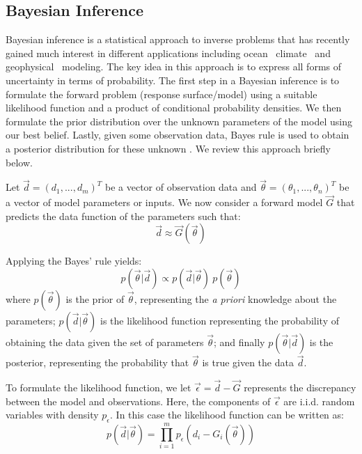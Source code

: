 \subsection{Bayesian Inference}
 \label{sec:inference}
 
Bayesian inference is a statistical approach to inverse problems
that has recently gained much interest in different applications including
ocean~\citep{Alexanderian2011a,Zedler2012,sraj:2013a}
climate~\citep{OlsonEtAl2012} and geophysical~\citep{Malinverno2002} modeling.
The key idea in this approach is to express all forms of uncertainty
in terms of probability. The first step in a Bayesian inference 
is to formulate the forward problem (response surface/model) using 
a suitable likelihood function and a product of conditional probability densities. 
We then formulate the prior distribution over the unknown parameters of the model
using our best belief. Lastly, given some observation data, Bayes rule 
is used to obtain a posterior distribution for these unknown
\citep{sivia}. We review this approach briefly below.

Let $\vec{d}=(d_1,...,d_m)^T$ be a vector of observation data and $\vec{\theta}=(\theta_1,...,\theta_n)^T$ be a vector of model parameters or inputs. We now consider a forward model $\vec G$ that predicts the data function of 
the parameters such that:
\begin{equation}
\vec d \approx \vec{G}( \vec \theta)
\end{equation}


Applying the Bayes' rule yields:
\begin{equation}
 p(\vec{\theta}| \vec d) \propto 
 p(\vec d | \vec{\theta}) \ p(\vec{\theta})  
\label{eq:bayes}
\end{equation}
where $p(\vec{\theta})$ is the prior of $\vec{\theta}$, representing the \emph{a priori} knowledge
about the parameters; 
$p(\vec d| \vec{\theta})$ is the likelihood function representing
the probability of obtaining the data given the set of parameters $\vec{\theta}$;
and finally $p(\vec{\theta}| \vec d)$ is the posterior,
representing the probability that $\vec{\theta}$ is true given the data $\vec d $.

To formulate the likelihood function, we let $\vec \epsilon = \vec d - \vec{G}$
represents the discrepancy between the model and observations.
Here, the components of $\vec \epsilon $ are i.i.d. random variables with density $p_{\epsilon}$.
In this case the likelihood function can be written as:
\begin{equation} 
p(\vec d |  \vec{\theta}) 
= 
\prod_{i=1}^m  
p_\epsilon (d_i - G_i(\vec \theta))  	
\label{eq:likelihood}
\end{equation}

